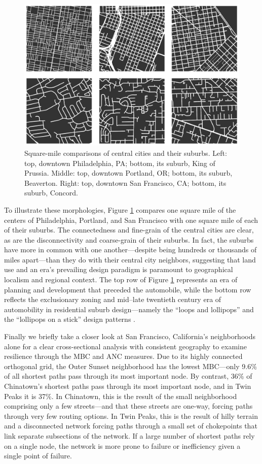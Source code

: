 \documentclass[Afour,sageh,times]{sagej}
\renewcommand{\cite}{\citep}
\begin{document}
\begin{figure}
	\includegraphics[width=1\textwidth]{fig05.png}
	\caption{Square-mile comparisons of central cities and their suburbs. Left: top, downtown Philadelphia, PA; bottom, its suburb, King of Prussia. Middle: top, downtown Portland, OR; bottom, its suburb, Beaverton. Right: top, downtown San Francisco, CA; bottom, its suburb, Concord.}
	\label{fig:fig05}
\end{figure}

To illustrate these morphologies, Figure \ref{fig:fig05} compares one square mile of the centers of Philadelphia, Portland, and San Francisco with one square mile of each of their suburbs. The connectedness and fine-grain of the central cities are clear, as are the disconnectivity and coarse-grain of their suburbs. In fact, the suburbs have more in common with one another---despite being hundreds or thousands of miles apart---than they do with their central city neighbors, suggesting that land use and an era's prevailing design paradigm is paramount to geographical localism and regional context. The top row of Figure \ref{fig:fig05} represents an era of planning and development that preceded the automobile, while the bottom row reflects the exclusionary zoning and mid--late twentieth century era of automobility in residential suburb design---namely the \enquote{loops and lollipops} and the \enquote{lollipops on a stick} design patterns \cite{southworth_streets_1997}.

Finally we briefly take a closer look at San Francisco, California's neighborhoods alone for a clear cross-sectional analysis with consistent geography to examine resilience through the MBC and ANC measures. Due to its highly connected orthogonal grid, the Outer Sunset neighborhood has the lowest MBC---only 9.6\% of all shortest paths pass through its most important node. By contrast, 36\% of Chinatown's shortest paths pass through its most important node, and in Twin Peaks it is 37\%. In Chinatown, this is the result of the small neighborhood comprising only a few streets---and that these streets are one-way, forcing paths through very few routing options. In Twin Peaks, this is the result of hilly terrain and a disconnected network forcing paths through a small set of chokepoints that link separate subsections of the network. If a large number of shortest paths rely on a single node, the network is more prone to failure or inefficiency given a single point of failure.
\end{document}
